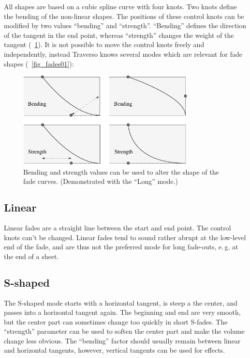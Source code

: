 All shapes are based on a cubic spline curve with four knots. Two knots define the bending of the non-linear shapes. The positions of these control knots can be modified by two values ``bending'' and ``strength''. ``Bending'' defines the direction of the tangent in the end point, whereas ``strength'' changes the weight of the tangent (\FigB~\ref{fig_fades02}). It is not possible to move the control knots freely and independently, instead Traverso knows several modes which are relevant for fade shapes (\FigB~\ref{fig_fades01}):

\begin{figure}[t]
 \centering\includegraphics[width=0.8\textwidth]{images/fades2}
 \caption{Bending and strength values can be used to alter the shape of the fade curves. (Demonstrated with the ``Long'' mode.)}
 \label{fig_fades02}
\end{figure}

\subsection{Linear}
Linear fades are a straight line between the start and end point. The control knots can't be changed. Linear fades tend to sound rather abrupt at the low-level end of the fade, and are thus not the preferred mode for long fade-outs, e.\,g. at the end of a sheet.

\subsection{S-shaped}
The S-shaped mode starts with a horizontal tangent, is steep a the center, and passes into a horizontal tangent again. The beginning and end are very smooth, but the center part can sometimes change too quickly in short S-fades. The ``strength'' parameter can be used to soften the center part and make the volume change less obvious. The ``bending'' factor should usually remain between linear and horizontal tangents, however, vertical tangents can be used for effects.

